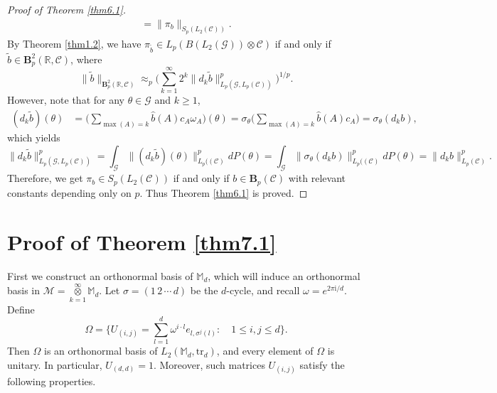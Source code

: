 \documentclass[oneside,english,a4wide]{amsart}
\numberwithin{equation}{section}
\numberwithin{figure}{section}
\theoremstyle{plain}
\theoremstyle{plain}
\theoremstyle{definition}
\theoremstyle{plain}
\theoremstyle{remark}
\theoremstyle{definition}
\theoremstyle{remark}
\theoremstyle{definition}
\newcommand{\8}{\infty}
\begin{document}
\begin{proof}[Proof of Theorem \ref{thm6.1}]
\begin{equation*}
\begin{aligned}
				=\|\pi_{b}\|_{S_p(L_2(\mathcal{C}))}.
			\end{aligned}
		\end{equation*}
		By Theorem \ref{thm1.2}, we have $\pi_{\tilde{b}}\in {L_p(B(L_2(\mathcal{G}))\otimes \mathcal{C})}$ if and only if $\tilde{b}\in \pmb{B}_p^2(\mathbb{R},\mathcal{C})$, where 
		\begin{equation*}
			\|\tilde{b}\|_{\pmb{B}_p^2(\mathbb{R},\mathcal{C})}\approx_p\biggl(\sum_{k=1}^\infty2^{k}\|d_k\tilde{b}\|^p_{L_p(\mathcal{G},L_p(\mathcal{C}))}\biggr)^{1/p}. 
		\end{equation*}
		However, note that for any $\theta\in\mathcal{G}$ and $k\geq 1$,
		\begin{equation*}
			\begin{aligned}
				(d_k \tilde{b})(\theta)&=\big(\sum_{\max(A)=k}\hat{b}(A)c_A\omega_A\big)(\theta)=\sigma_\theta\big(\sum_{\max(A)=k}\hat{b}(A)c_A\big)=\sigma_\theta(d_k b),
			\end{aligned}
		\end{equation*}
		which yields
		\[\|d_k\tilde{b}\|^p_{L_p(\mathcal{G},L_p(\mathcal{C}))}=\int_{\mathcal{G}}\|(d_k \tilde{b})(\theta)\|_{L_p((\mathcal{C})}^p dP(\theta) =\int_{\mathcal{G}}\|\sigma_\theta(d_kb)\|_{L_p((\mathcal{C})}^p dP(\theta) =\|d_kb\|^p_{L_p(\mathcal{C})}.\]
		Therefore, we get $\pi_b\in S_p(L_2(\mathcal{C}))$ if and only if $b\in \pmb{B}_p(\mathcal{C})$ with relevant constants depending only on $p$. Thus Theorem \ref{thm6.1} is proved.
	\end{proof}
	


\bigskip

\section{Proof of Theorem \ref{thm7.1}}\label{Application 2}

First we construct an orthonormal basis of $\mathbb{M}_d$, which will induce an orthonormal basis in $\mathscr{M}=\mathop{\otimes}\limits_{k=1}^{\infty}\mathbb{M}_{d}$.  Let 
$\sigma=(1\,2\,\cdots\,d)$ be the $d$-cycle, and recall $\omega=e^{2\pi \mathrm{i}/d}$. Define
\[\Omega=\biggl\{U_{(i,j)}=\sum_{l=1}^d \omega^{i\cdot l}e_{l,\sigma^{j}(l)}:\quad 1\le i,j\le d\biggr\}.\]
Then $\Omega$ is an orthonormal basis of $L_2(\mathbb{M}_d,\mathrm{tr}_d)$, and every element of $\Omega$ is unitary. In particular, $U_{(d,d)}=1$. Moreover, such matrices $U_{(i,j)}$ satisfy the following properties.
\end{document}
